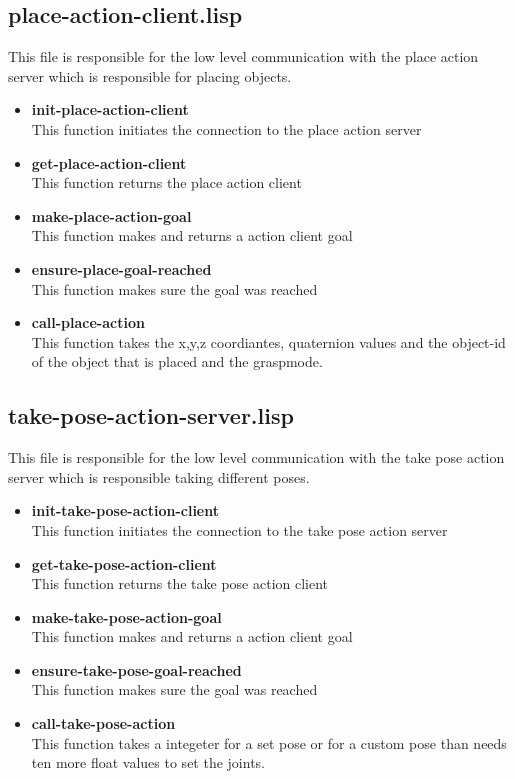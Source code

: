 \documentclass[main.tex]{subfiles}
\begin{document}
		\subsection{place-action-client.lisp}
		This file is responsible for the low level communication with the
		place action server which is responsible for placing objects.
	    \begin{itemize}
			\item \textbf{init-place-action-client} \\
			This function initiates the connection to the place action server
			\item \textbf{get-place-action-client} \\
			This function returns the place action client
			\item \textbf{make-place-action-goal} \\
			This function makes and returns a action client goal
			\item \textbf{ensure-place-goal-reached} \\
            This function makes sure the goal was reached
			\item \textbf{call-place-action} \\
			This function takes the x,y,z coordiantes, quaternion values  and the object-id of the object that is placed and the graspmode.
		\end{itemize}
		\subsection{take-pose-action-server.lisp}
		This file is responsible for the low level communication with the
		take pose action server which is responsible taking different poses.
		\begin{itemize}
			\item \textbf{init-take-pose-action-client} \\
			This function initiates the connection to the take pose action server
			\item \textbf{get-take-pose-action-client} \\
			This function returns the take pose action client
			\item \textbf{make-take-pose-action-goal} \\
			This function makes and returns a action client goal
			\item \textbf{ensure-take-pose-goal-reached} \\
            This function makes sure the goal was reached
			\item \textbf{call-take-pose-action} \\
			This function takes a integeter for a set pose or for a custom pose than needs ten more float values to set the joints.
		\end{itemize}
\end{document}
